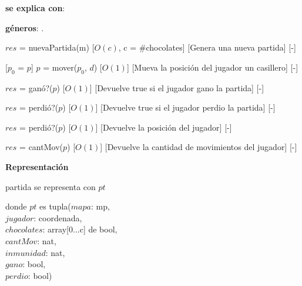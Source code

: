 \documentclass{book}
\begin{document}
    \begin{Interfaz}

        \textbf{se explica con}: 

        \textbf{géneros}: .


            {$res$ = nuevaPartida(m)}%
            [$O(c)$, c = \#chocolates]
            [Genera una nueva partida]
            [-]

            [$p_0$ = $p$]
            {$p$ = mover($p_0$, $d$)}%
            [$O(1)$]
            [Mueva la posición del jugador un casillero]
            [-]

            {$res$ = ganó?($p$)}%
            [$O(1)$]
            [Devuelve true si el jugador gano la partida]
            [-]

            {$res$ = perdió?($p$)}%
            [$O(1)$]
            [Devuelve true si el jugador perdio la partida]
            [-]

            {$res$ = perdió?($p$)}%
            [$O(1)$]
            [Devuelve la posición del jugador]
            [-]

            {$res$ = cantMov($p$)}%
            [$O(1)$]
            [Devuelve la cantidad de movimientos del jugador]
            [-]

    \end{Interfaz}

    \newpage

    \textbf{Representación}

    partida se representa con $pt$

    donde $pt$ es tupla($mapa$: mp, \\
        \text{}\qquad\quad$jugador$: coordenada, \\
        \text{}\qquad\quad$chocolates$: array[0...c] de bool, \\
        \text{}\qquad\quad$cantMov$: nat, \\
        \text{}\qquad\quad$inmunidad$: nat, \\
        \text{}\qquad\quad$gano$: bool, \\
        \text{}\qquad\quad$perdio$: bool)
\end{document}
